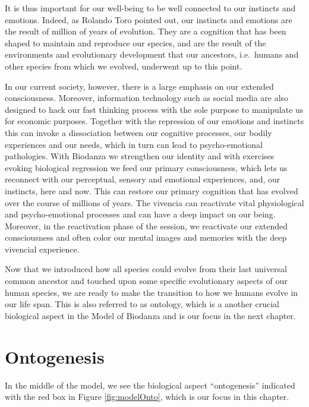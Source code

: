\documentclass[
  11pt,
]{book}
\begin{document}
It is thus important for our well-being to be well connected to our instincts and emotions. Indeed, as Rolando Toro pointed out, our instincts and emotions are the result of million of years of evolution. They are a cognition that has been shaped to maintain and reproduce our species, and are the result of the environments and evolutionary development that our ancestors, i.e.~humans and other species from which we evolved, underwent up to this point.

In our current society, however, there is a large emphasis on our extended consciousness. Moreover, information technology such as social media are also designed to hack our fast thinking process with the sole purpose to manipulate us for economic purposes. Together with the repression of our emotions and instincts this can invoke a dissociation between our cognitive processes, our bodily experiences and our needs, which in turn can lead to psycho-emotional pathologies. With Biodanza we strengthen our identity and with exercises evoking biological regression we feed our primary consciousness, which lets us reconnect with our perceptual, sensory and emotional experiences, and, our instincts, here and now. This can restore our primary cognition that has evolved over the course of millions of years. The vivencia can reactivate vital physiological and psycho-emotional processes and can have a deep impact on our being. Moreover, in the reactivation phase of the session, we reactivate our extended consciousness and often color our mental images and memories with the deep vivencial experience.

Now that we introduced how all species could evolve from their last universal common ancestor and touched upon some specific evolutionary aspects of our human species, we are ready to make the transition to how we humans evolve in our life span. This is also referred to as ontology, which is a another crucial biological aspect in the Model of Biodanza and is our focus in the next chapter.

\hypertarget{ontogenesis}{%
\chapter{Ontogenesis}\label{ontogenesis}}

In the middle of the model, we see the biological aspect ``ontogenesis'' indicated with the red box in Figure \ref{fig:modelOnto}, which is our focus in this chapter.
\end{document}
